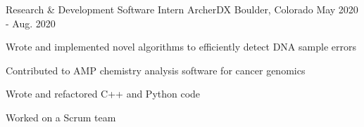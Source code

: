 \begin{cventries}
  \cventry
    {Research \& Development Software Intern}
    {ArcherDX}
    {Boulder, Colorado}
    {May 2020 - Aug. 2020}
    {
      \begin{cvitems}
        \item {Wrote and implemented novel algorithms to efficiently detect DNA sample errors}
        \item {Contributed to AMP chemistry analysis software for cancer genomics}
        \item {Wrote and refactored C++ and Python code}
        \item {Worked on a Scrum team}
      \end{cvitems}
    }

\end{cventries}

